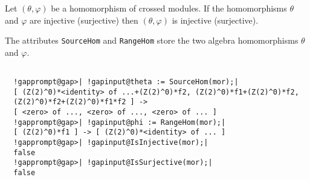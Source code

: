 \documentclass[a4paper,11pt]{report}
\begin{document}
{{{ Let $(\theta,\varphi)$ be a homomorphism of crossed modules. If the homomorphisms $\theta$ and $\varphi$ are injective (surjective) then $(\theta,\varphi)$ is injective (surjective). 

 The attributes \texttt{SourceHom} and \texttt{RangeHom} store the two algebra homomorphisms $\theta$ and $\varphi$. }

 
\begin{Verbatim}[commandchars=!@|,fontsize=\small,frame=single,label=Example]
  
  !gapprompt@gap>| !gapinput@theta := SourceHom(mor);|
  [ (Z(2)^0)*<identity> of ...+(Z(2)^0)*f2, (Z(2)^0)*f1+(Z(2)^0)*f2, 
  (Z(2)^0)*f2+(Z(2)^0)*f1*f2 ] ->
  [ <zero> of ..., <zero> of ..., <zero> of ... ]
  !gapprompt@gap>| !gapinput@phi := RangeHom(mor);|
  [ (Z(2)^0)*f1 ] -> [ (Z(2)^0)*<identity> of ... ]
  !gapprompt@gap>| !gapinput@IsInjective(mor);|
  false
  !gapprompt@gap>| !gapinput@IsSurjective(mor);|
  false
  
\end{Verbatim}
 }

 }

            
\end{document}
